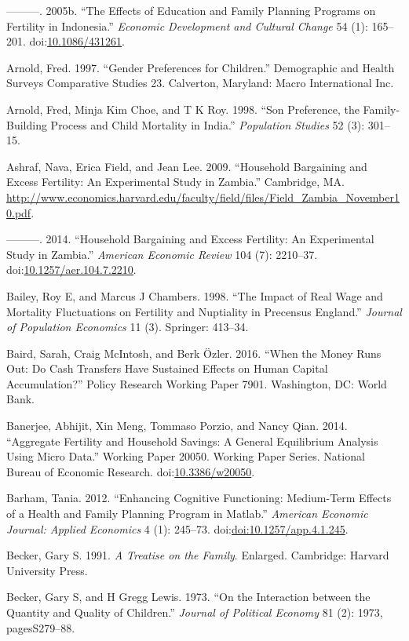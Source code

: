 \documentclass[]{article}
\begin{document}
---------. 2005b. ``The Effects of Education and Family Planning Programs on Fertility in Indonesia.'' \emph{Economic Development and Cultural Change} 54 (1): 165--201. doi:\href{https://doi.org/10.1086/431261}{10.1086/431261}.

Arnold, Fred. 1997. ``Gender Preferences for Children.'' Demographic and Health Surveys Comparative Studies 23. Calverton, Maryland: Macro International Inc.

Arnold, Fred, Minja Kim Choe, and T K Roy. 1998. ``Son Preference, the Family-Building Process and Child Mortality in India.'' \emph{Population Studies} 52 (3): 301--15.

Ashraf, Nava, Erica Field, and Jean Lee. 2009. ``Household Bargaining and Excess Fertility: An Experimental Study in Zambia.'' Cambridge, MA. \url{http://www.economics.harvard.edu/faculty/field/files/Field_Zambia_November10.pdf}.

---------. 2014. ``Household Bargaining and Excess Fertility: An Experimental Study in Zambia.'' \emph{American Economic Review} 104 (7): 2210--37. doi:\href{https://doi.org/10.1257/aer.104.7.2210}{10.1257/aer.104.7.2210}.

Bailey, Roy E, and Marcus J Chambers. 1998. ``The Impact of Real Wage and Mortality Fluctuations on Fertility and Nuptiality in Precensus England.'' \emph{Journal of Population Economics} 11 (3). Springer: 413--34.

Baird, Sarah, Craig McIntosh, and Berk Özler. 2016. ``When the Money Runs Out: Do Cash Transfers Have Sustained Effects on Human Capital Accumulation?'' Policy Research Working Paper 7901. Washington, DC: World Bank.

Banerjee, Abhijit, Xin Meng, Tommaso Porzio, and Nancy Qian. 2014. ``Aggregate Fertility and Household Savings: A General Equilibrium Analysis Using Micro Data.'' Working Paper 20050. Working Paper Series. National Bureau of Economic Research. doi:\href{https://doi.org/10.3386/w20050}{10.3386/w20050}.

Barham, Tania. 2012. ``Enhancing Cognitive Functioning: Medium-Term Effects of a Health and Family Planning Program in Matlab.'' \emph{American Economic Journal: Applied Economics} 4 (1): 245--73. doi:\href{https://doi.org/doi:10.1257/app.4.1.245}{doi:10.1257/app.4.1.245}.

Becker, Gary S. 1991. \emph{A Treatise on the Family}. Enlarged. Cambridge: Harvard University Press.

Becker, Gary S, and H Gregg Lewis. 1973. ``On the Interaction between the Quantity and Quality of Children.'' \emph{Journal of Political Economy} 81 (2): 1973, pagesS279--88.
\end{document}
